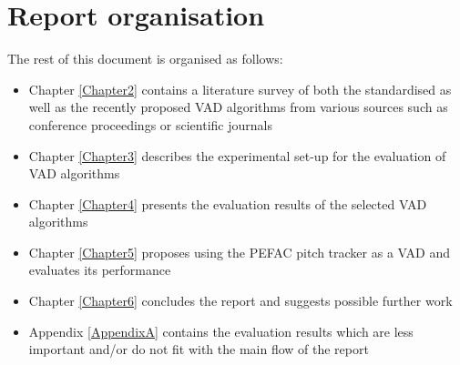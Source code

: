 \section{Report organisation}

The rest of this document is organised as follows:
\begin{itemize}
\item Chapter \ref{Chapter2} contains a literature survey of both the standardised as well as the recently proposed VAD algorithms from various sources such as conference proceedings or scientific journals
\item Chapter \ref{Chapter3} describes the experimental set-up for the evaluation of VAD algorithms
\item Chapter \ref{Chapter4} presents the evaluation results of the selected VAD algorithms
\item Chapter \ref{Chapter5} proposes using the PEFAC pitch tracker \cite{PEFAC} as a VAD and evaluates its performance
\item Chapter \ref{Chapter6} concludes the report and suggests possible further work 
\item Appendix \ref{AppendixA} contains the evaluation results which are less important and/or do not fit with the main flow of the report
\end{itemize}